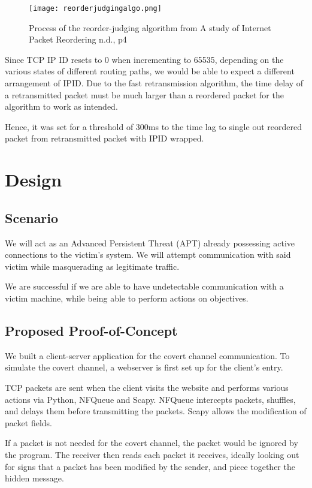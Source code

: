 \documentclass[letterpaper,twocolumn,10pt]{article}
\begin{document}
\begin{figure}[htp]
    \centering
    \texttt{[image: reorderjudgingalgo.png]}
    \caption{Process of the reorder-judging algorithm from A study of Internet Packet Reordering n.d., p4}
\end{figure}

Since TCP IP ID resets to 0 when incrementing to 65535, depending on the various states of different routing paths, we would be able to expect a different arrangement of IPID. Due to the fast retransmission algorithm, the time delay of a retransmitted packet must be much larger than a reordered packet for the algorithm to work as intended. 

Hence, it was set for a threshold of 300ms to the time lag to single out reordered packet from retransmitted packet with IPID wrapped\cite{packetreordering}.

\section{Design}

\subsection{Scenario}

We will act as an Advanced Persistent Threat (APT) already possessing active connections to the victim’s system. We will attempt communication with said victim while masquerading as legitimate traffic. 

We are successful if we are able to have undetectable communication with a victim machine, while being able to perform actions on objectives.

\subsection{Proposed Proof-of-Concept}

We built a client-server application for the covert channel communication. To simulate the covert channel, a webserver is first set up for the client’s entry.

TCP packets are sent when the client visits the website and performs various actions via Python, NFQueue and Scapy. NFQueue intercepts packets, shuffles, and delays them before transmitting the packets. Scapy allows the modification of packet fields.

If a packet is not needed for the covert channel, the packet would be ignored by the program. The receiver then reads each packet it receives, ideally looking out for signs that a packet has been modified by the sender, and piece together the hidden message.
\end{document}
